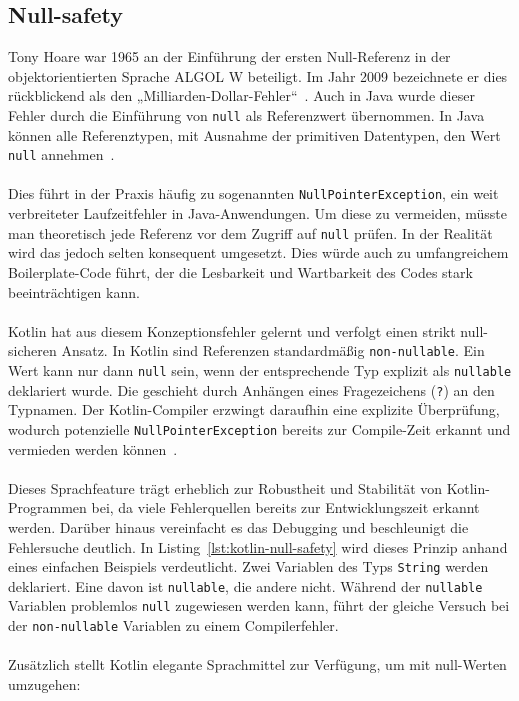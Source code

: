\documentclass[11pt]{article}
\begin{document}
    \subsection{Null-safety}
    Tony Hoare war 1965 an der Einführung der ersten Null-Referenz in der objektorientierten Sprache ALGOL W beteiligt.
    Im Jahr 2009 bezeichnete er dies rückblickend als den „Milliarden-Dollar-Fehler“~\cite{billion-dollar-mistake}.
    Auch in Java wurde dieser Fehler durch die Einführung von \texttt{null} als Referenzwert übernommen.
    In Java können alle Referenztypen, mit Ausnahme der primitiven Datentypen, den Wert \texttt{null} annehmen~\cite{kotlin-null}.\\
    \\
    Dies führt in der Praxis häufig zu sogenannten \texttt{NullPointerException}, ein weit verbreiteter Laufzeitfehler in Java-Anwendungen.
    Um diese zu vermeiden, müsste man theoretisch jede Referenz vor dem Zugriff auf \texttt{null} prüfen.
    In der Realität wird das jedoch selten konsequent umgesetzt.
    Dies würde auch zu umfangreichem Boilerplate-Code führt, der die Lesbarkeit und Wartbarkeit des Codes stark beeinträchtigen kann.\\
    \\
    Kotlin hat aus diesem Konzeptionsfehler gelernt und verfolgt einen strikt null-sicheren Ansatz.
    In Kotlin sind Referenzen standardmäßig \texttt{non-nullable}.
    Ein Wert kann nur dann \texttt{null} sein, wenn der entsprechende Typ explizit als \texttt{nullable} deklariert wurde.
    Die geschieht durch Anhängen eines Fragezeichens (\texttt{?}) an den Typnamen.
    Der Kotlin-Compiler erzwingt daraufhin eine explizite Überprüfung, wodurch potenzielle \texttt{NullPointerException} bereits zur Compile-Zeit erkannt und vermieden werden können~\cite{kotlin-null}.\\
    \\
    Dieses Sprachfeature trägt erheblich zur Robustheit und Stabilität von Kotlin-Programmen bei, da viele Fehlerquellen bereits zur Entwicklungszeit erkannt werden.
    Darüber hinaus vereinfacht es das Debugging und beschleunigt die Fehlersuche deutlich.
    In Listing~\ref{lst:kotlin-null-safety} wird dieses Prinzip anhand eines einfachen Beispiels verdeutlicht.
    Zwei Variablen des Typs \texttt{String} werden deklariert.
    Eine davon ist \texttt{nullable}, die andere nicht.
    Während der \texttt{nullable} Variablen problemlos \texttt{null} zugewiesen werden kann, führt der gleiche Versuch bei der \texttt{non-nullable} Variablen zu einem Compilerfehler.\\
    \\
    Zusätzlich stellt Kotlin elegante Sprachmittel zur Verfügung, um mit null-Werten umzugehen:
\end{document}
